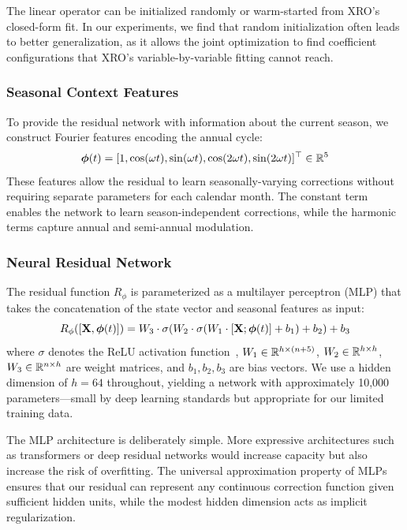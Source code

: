 The linear operator can be initialized randomly or warm-started from XRO's closed-form fit. In our experiments, we find that random initialization often leads to better generalization, as it allows the joint optimization to find coefficient configurations that XRO's variable-by-variable fitting cannot reach.

\subsubsection{Seasonal Context Features}

To provide the residual network with information about the current season, we construct Fourier features encoding the annual cycle:
\begin{equation}
    \boldsymbol{\phi}(t) = [1, \cos(\omega t), \sin(\omega t), \cos(2\omega t), \sin(2\omega t)]^\top \in \mathbb{R}^5
\end{equation}
These features allow the residual to learn seasonally-varying corrections without requiring separate parameters for each calendar month. The constant term enables the network to learn season-independent corrections, while the harmonic terms capture annual and semi-annual modulation.

\subsubsection{Neural Residual Network}

The residual function $R_\phi$ is parameterized as a multilayer perceptron (MLP) that takes the concatenation of the state vector and seasonal features as input:
\begin{equation}
    R_\phi([\mathbf{X}, \boldsymbol{\phi}(t)]) = W_3 \cdot \sigma(W_2 \cdot \sigma(W_1 \cdot [\mathbf{X}; \boldsymbol{\phi}(t)] + b_1) + b_2) + b_3
\end{equation}
where $\sigma$ denotes the ReLU activation function~\cite{nair2010rectified}, $W_1 \in \mathbb{R}^{h \times (n+5)}$, $W_2 \in \mathbb{R}^{h \times h}$, $W_3 \in \mathbb{R}^{n \times h}$ are weight matrices, and $b_1, b_2, b_3$ are bias vectors. We use a hidden dimension of $h = 64$ throughout, yielding a network with approximately 10,000 parameters---small by deep learning standards but appropriate for our limited training data.

The MLP architecture is deliberately simple. More expressive architectures such as transformers or deep residual networks would increase capacity but also increase the risk of overfitting. The universal approximation property of MLPs~\cite{hornik1989multilayer,cybenko1989approximation} ensures that our residual can represent any continuous correction function given sufficient hidden units, while the modest hidden dimension acts as implicit regularization.

